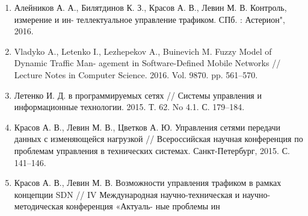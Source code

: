 
\begin{enumerate}[{label=\arabic{*}}]
    \item Алейников А. А., Билятдинов К. З., Красов А. В., Левин М. В. Контроль, измерение и ин-
теллектуальное управление трафиком. СПб. : Астерион", 2016.
    \item Vladyko A., Letenko I., Lezhepekov A., Buinevich M. Fuzzy Model of Dynamic Traffic Man-
agement in Software-Defined Mobile Networks // Lecture Notes in Computer Science. 2016. Vol. 9870.
pp. 561–570.
    \item Летенко И. Д. в программируемых сетях // Системы управления и информационные технологии. 2015. Т. 62. No 4.1. С. 179–184.
    \item Красов А. В., Левин М. В., Цветков А. Ю. Управления сетями передачи данных с изменяющейся нагрузкой // Всероссийская научная конференция по проблемам управления в технических системах. Санкт-Петербург, 2015. С. 141–146.
    \item Красов А. В., Левин М. В. Возможности управления трафиком в рамках концепции
SDN // IV Международная научно-техническая и научно-методическая конференция «Актуаль-
ные проблемы ин
\end{enumerate}
